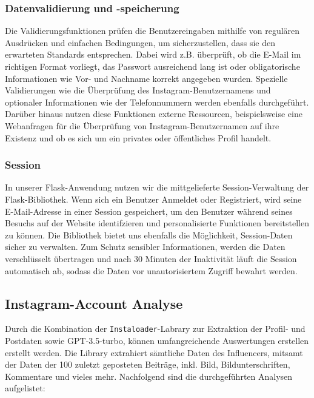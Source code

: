 \documentclass[conference,a4paper,flushend]{cs-techrep}
\begin{document}
\subsubsection{Datenvalidierung und -speicherung}
Die Validierungsfunktionen prüfen die Benutzereingaben mithilfe von regulären Ausdrücken und einfachen Bedingungen, um sicherzustellen, dass sie den erwarteten Standards entsprechen. Dabei wird z.B. überprüft, ob die E-Mail im richtigen Format vorliegt, das Passwort ausreichend lang ist oder obligatorische Informationen wie Vor- und Nachname korrekt angegeben wurden. Spezielle Validierungen wie die Überprüfung des Instagram-Benutzernamens und optionaler Informationen wie der Telefonnummern werden ebenfalls durchgeführt. Darüber hinaus nutzen diese Funktionen externe Ressourcen, beispielsweise eine Webanfragen für die Überprüfung von Instagram-Benutzernamen auf ihre Existenz und ob es sich um ein privates oder öffentliches Profil handelt. 




\subsubsection{Session}
In unserer Flask-Anwendung nutzen wir die mittgelieferte Session-Verwaltung der Flask-Bibliothek. Wenn sich ein Benutzer Anmeldet oder Registriert, wird seine E-Mail-Adresse in einer Session gespeichert, um den Benutzer während seines Besuchs auf der Website identifzieren und personalisierte Funktionen bereitstellen zu können. Die Bibliothek bietet uns ebenfalls die Möglichkeit, Session-Daten sicher zu verwalten. Zum Schutz sensibler Informationen, werden die Daten verschlüsselt übertragen und nach 30 Minuten der Inaktivität läuft die Session automatisch ab, sodass die Daten vor unautorisiertem Zugriff bewahrt werden. 


\subsection{Instagram-Account Analyse}
Durch die Kombination der \texttt{Instaloader}-Labrary zur Extraktion der Profil- und Postdaten sowie GPT-3.5-turbo, können umfangreichende Auswertungen erstellen erstellt werden. Die Library extrahiert sämtliche Daten des Influencers, mitsamt der Daten der 100 zuletzt geposteten Beiträge, inkl. Bild, Bildunterschriften, Kommentare und vieles mehr. Nachfolgend sind die durchgeführten Analysen aufgelistet:
\end{document}
